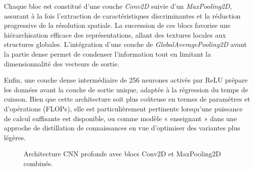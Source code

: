 Chaque bloc est constitué d’une couche \textit{Conv2D} suivie d’un \textit{MaxPooling2D}, assurant à la fois l’extraction de caractéristiques discriminantes et la réduction progressive de la résolution spatiale. La succession de ces blocs favorise une hiérarchisation efficace des représentations, allant des textures locales aux structures globales. L’intégration d’une couche de \textit{GlobalAveragePooling2D} avant la partie dense permet de condenser l’information tout en limitant la dimensionnalité des vecteurs de sortie.  

Enfin, une couche dense intermédiaire de 256 neurones activés par ReLU prépare les données avant la couche de sortie unique, adaptée à la régression du temps de cuisson. Bien que cette architecture soit plus coûteuse en termes de paramètres et d’opérations (FLOPs), elle est particulièrement pertinente lorsqu’une puissance de calcul suffisante est disponible, ou comme modèle « enseignant » dans une approche de distillation de connaissances en vue d’optimiser des variantes plus légères.  


\begin{figure}[H]
    \centering
    \small
    \caption{Architecture CNN profonde avec blocs Conv2D et MaxPooling2D combinés.}
    \label{fig:cnn2_tbnet5}
\end{figure}



